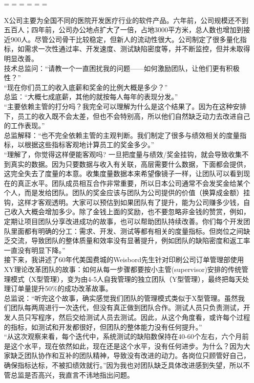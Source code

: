 \begin{description}
\tightlist
\item[]
= = = = = =
\end{description}

X公司主要为全国不同的医院开发医疗行业的软件产品。六年前，公司规模还不到五百人；四年前，公司办公地点扩大了一倍，占地3000平方米，总人数也增加到接近900人。尽管公司骨干比较稳定，但新人的流动性很大。公司制定了很多量化指标，如需求一次性通过率、开发速度、测试缺陷密度等，并不断监控，但并未取得明显改善。\\
技术总监问：``请教一个一直困扰我的问题------如何激励团队，让他们更有积极性？''\\
``现在你们员工的收入底薪和奖金的比例大概是多少？''\\
总监：``大概七成底薪，其他的就按每人每年的表现分发。''\\
``主要依赖主管的打分吗？我完全可以理解为什么是这个结果了。因为在这种安排下，员工的收入既不会太差，但也不会特别高，所以他们自然缺乏动力去改进自己的工作表现。''\\
总监解释：``也不完全依赖主管的主观判断。我们制定了很多与绩效相关的度量指标，以根据这些指标客观地计算员工的奖金多少。''\\
``理解了，你觉得这样便能客观吗?
一旦把度量与绩效/奖金挂钩，就会导致收集不到真实的数据。因为只要数据与收入有关联，高层需要什么数据，下面都会提供，这完全失去了度量的本意。收集度量数据本来希望像镜子一样，让团队可以看到现在的真正水平。团队成员相互合作非常重要，所以日本公司通常不会发奖金给某个个人，而是发给团队。团队的奖金应该与团队为公司提供的价值（换算成金额）挂钩，这样才客观透明。大家可以预估到如果团队有了提升，能为公司赚多少钱，自己收入大概会增加多少。除了金钱上面的奖励，也不要忽略非金钱的赞赏，例如，定期让项目团队分享改进成功的故事，也可以帮助团队持续改善。你们每个开发团队里面都有明确的分工：需求、开发、测试等都有相关的度量指标。但岗位之间缺乏交流，导致团队的整体质量和效率没有显著提升，例如团队的缺陷密度和返工率一直没有明显下降。''\\
接下来，我讲述了60年代美国费城的Weisbord先生针对印刷公司订单管理部使用XY理论改革团队的故事：如何从每一步骤都要按小主管(supervisor)安排的传统管理模式（X型管理），变为由4-5人自我管理的独立团队（Y型管理），最终把每天处理订单量提升50\%的成功改革故事。\\
总监说：``听完这个故事，确实感觉我们团队的管理模式类似于X型管理。虽然我们团队每两周进行一次迭代，但没有真正做到团队合作。测试人员只负责测试，开发人员只写程序，然后交给测试人员去测试。因此，从这个角度看，或许每个过程的指标，如测试和开发都很好，但团队的整体能力没有任何提升。''\\
``从这次观察来看，每个迭代中，系统测试的缺陷数保持在40-60个左右，六个月前是这个水平，现在依然如此，现在还是这个水平，没有任何进步。为什么？因为大家缺乏团队协作和互补的团队精神，导致没有改进的动力。各岗位只顾管好自己，确保指标达标，不被扣绩效就行。''因为我也对团队缺乏具体改进感到失望，所以不管总监是否高兴，我直言不讳地指出问题。\\

